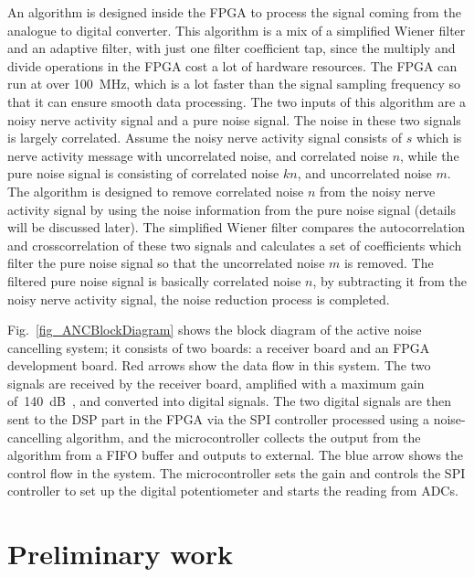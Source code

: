 An algorithm is designed inside the FPGA to process the signal coming from the analogue to digital converter.  This algorithm is a mix of a simplified Wiener filter and an adaptive filter, with just one filter coefficient tap, since the multiply and divide operations in the FPGA cost a lot of hardware resources.  The FPGA can run at over \qty{100}{MHz}, which is a lot faster than the signal sampling frequency so that it can ensure smooth data processing.  The two inputs of this algorithm are a noisy nerve activity signal and a pure noise signal.  The noise in these two signals is largely correlated.  Assume the noisy nerve activity signal consists of $s$ which is nerve activity message with uncorrelated noise, and correlated noise $n$, while the pure noise signal is consisting of correlated noise $kn$, and uncorrelated noise $m$.  The algorithm is designed to remove correlated noise $n$ from the noisy nerve activity signal by using the noise information from the pure noise signal (details will be discussed later).  The simplified Wiener filter compares the autocorrelation and crosscorrelation of these two signals and calculates a set of coefficients which filter the pure noise signal so that the uncorrelated noise $m$ is removed.  The filtered pure noise signal is basically correlated noise $n$, by subtracting it from the noisy nerve activity signal, the noise reduction process is completed.

Fig.~\ref{fig_ANCBlockDiagram} shows the block diagram of the active noise cancelling system;  it consists of two boards: a receiver board and an FPGA development board.  Red arrows show the data flow in this system.  The two signals are received by the receiver board, amplified with a maximum gain of~\qty{140}{dB\Omega}, and converted into digital signals.  The two digital signals are then sent to the DSP part in the FPGA via the SPI controller processed using a noise-cancelling algorithm, and the microcontroller collects the output from the algorithm from a FIFO buffer and outputs to external.  The blue arrow shows the control flow in the system.  The microcontroller sets the gain and controls the SPI controller to set up the digital potentiometer and starts the reading from ADCs.


\section{Preliminary work}

